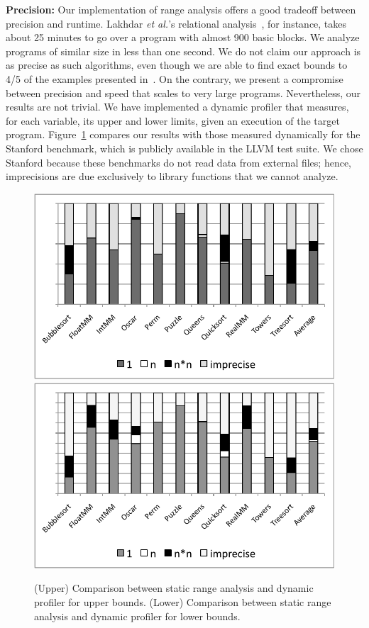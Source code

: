 \documentclass{sigplanconf}[10pt]
\begin{document}
\noindent
\textbf{Precision: }
Our implementation of range analysis offers a good tradeoff between
precision and runtime.
Lakhdar {\em et al.}'s relational analysis~\cite{Lakhdar11}, for instance,
takes about 25 minutes to go over a program with almost 900 basic blocks.
We analyze programs of similar size in less than one second.
We do not claim our approach is as precise as such algorithms, even though we
are able to find exact bounds to 4/5 of the examples presented
in~\cite{Lakhdar11}.
On the contrary, we present a compromise between precision and speed
that scales to very large programs.
Nevertheless, our results are not trivial.
We have implemented a dynamic profiler that measures, for each variable,
its upper and lower limits, given an execution of the target program.
Figure~\ref{fig:precision} compares our results with those measured
dynamically for the Stanford benchmark, which is publicly
available in the LLVM test suite.
We chose Stanford because these benchmarks do not read data from external
files; hence, imprecisions are due exclusively to library functions that we cannot
analyze.

\begin{figure}[t!]
\begin{center}
\includegraphics[width=\columnwidth]{images/precUpperBound}
\includegraphics[width=\columnwidth]{images/precLowerBound}
\end{center}
\caption{\label{fig:precision}
(Upper) Comparison between static range analysis and dynamic profiler for
upper bounds.
(Lower) Comparison between static range analysis and dynamic profiler for
lower bounds.}
\end{figure}
\end{document}
